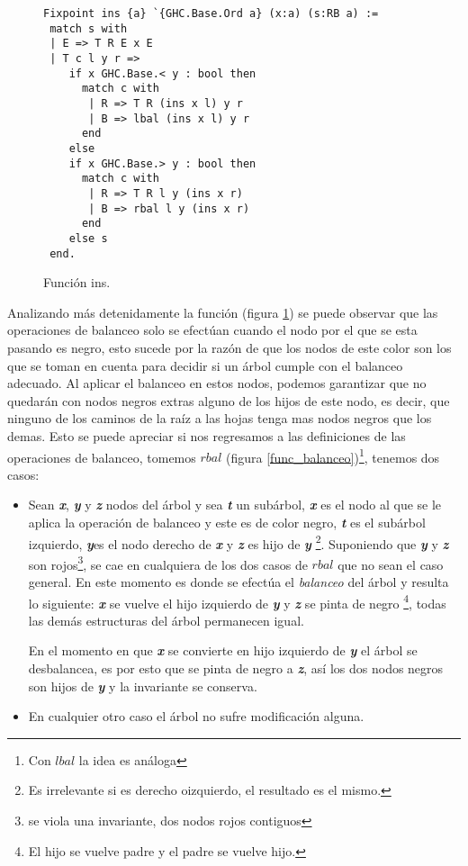 \begin{figure}
\centering
\captionsetup{justification=centering}
\begin{verbatim}
Fixpoint ins {a} `{GHC.Base.Ord a} (x:a) (s:RB a) :=
 match s with
 | E => T R E x E
 | T c l y r =>
    if x GHC.Base.< y : bool then
      match c with
       | R => T R (ins x l) y r
       | B => lbal (ins x l) y r
      end
    else
    if x GHC.Base.> y : bool then
      match c with
       | R => T R l y (ins x r)
       | B => rbal l y (ins x r)
      end
    else s
 end.
\end{verbatim}
\caption{Funci\'on ins.}
\label{func_ins}
\end{figure}

Analizando m\'as detenidamente la funci\'on (figura \ref{func_ins}) se puede observar que las
operaciones de balanceo solo se efectúan cuando el nodo por el que se esta pasando es negro, esto
sucede por la raz\'on de que los nodos de este color son los que se toman en cuenta para decidir si
un \'arbol cumple con el balanceo adecuado. Al aplicar el balanceo en estos nodos, podemos 
garantizar que no quedar\'an con nodos negros extras alguno de los hijos de este nodo, es decir, que
ninguno de los caminos de la ra\'iz a las hojas tenga mas nodos negros que los demas. Esto se puede
apreciar si nos regresamos a las definiciones de las operaciones de balanceo, tomemos $rbal$ (figura
\ref{func_balanceo})\footnote{Con $lbal$ la idea es an\'aloga}, tenemos dos casos:

\begin{itemize}
    \item Sean \textbf{\textit{x}}, \textbf{\textit{y}} y \textbf{\textit{z}} nodos del \'arbol y 
    sea \textbf{\textit{t}} un subárbol, \textbf{\textit{x}} es el nodo al que se le aplica la 
    operaci\'on de balanceo y este es de color negro, \textbf{\textit{t}} es el subárbol izquierdo,
    \textbf{\textit{y}}es el nodo derecho de \textbf{\textit{x}} y \textbf{\textit{z}} es hijo de
    \textbf{\textit{y}} \footnote{Es irrelevante si es derecho oizquierdo, el resultado es el mismo.
    }. Suponiendo que \textbf{\textit{y}} y \textbf{\textit{z}} son rojos\footnote{se viola una 
    invariante, dos nodos rojos contiguos}, se cae en cualquiera de los dos casos de $rbal$ que no 
    sean el caso general. En este momento es donde se efectúa el \textit{balanceo} del árbol y 
    resulta lo siguiente: \textbf{\textit{x}} se vuelve el hijo izquierdo de \textbf{\textit{y}} y
    \textbf{\textit{z}} se pinta de negro \footnote{El hijo se vuelve padre y el padre se vuelve 
    hijo.}, todas las dem\'as estructuras del \'arbol permanecen igual.

    En el momento en que \textbf{\textit{x}} se convierte en hijo izquierdo de \textbf{\textit{y}}
    el \'arbol se desbalancea, es por esto que se pinta de negro a \textbf{\textit{z}}, así los dos
    nodos negros son hijos de \textbf{\textit{y}} y la invariante se conserva.
    \item En cualquier otro caso el \'arbol no sufre modificaci\'on alguna.
\end{itemize}

